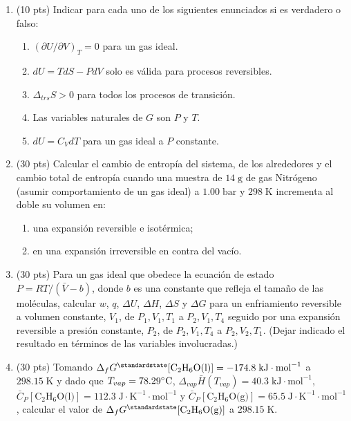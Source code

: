 \documentclass[a4paper,12pt]{article}
\begin{document}
\begin{enumerate}

 \item (10 pts) Indicar para cada uno de los siguientes enunciados si es verdadero o falso:
 \begin{enumerate}
  \item $(\partial U/\partial V)_T=0$ para un gas ideal.
  \item $dU=TdS-PdV$ solo es v\'alida para procesos reversibles. 
  \item $\Delta_{trs}S>0$ para todos los procesos de transici\'on. 
  \item Las variables naturales de $G$ son $P$ y $T$.
  \item $dU=C_VdT$ para un gas ideal a $P$ constante.
 \end{enumerate}

 \item (30 pts) Calcular el cambio de entrop\'ia del sistema, de los alrededores y el cambio total de entrop\'ia cuando una muestra de $14\;\mbox{g}$ de gas Nitr\'ogeno (asumir comportamiento de un gas ideal) a $1.00\;\mbox{bar}$ y $298\;\mbox{K}$ incrementa al doble su volumen en:
 \begin{enumerate}
  \item una expansi\'on reversible e isot\'ermica;
  \item en una expansi\'on irreversible en contra del vac\'io.
 \end{enumerate} 

 \item (30 pts) Para un gas ideal que obedece la ecuaci\'on de estado $P=RT/(\bar{V}-b)$, donde $b$ es una constante que refleja el tama\~no de las mol\'eculas, calcular $w$, $q$, $\Delta U$, $\Delta H$, $\Delta S$ y $\Delta G$ para un enfriamiento reversible a volumen constante, $V_1$, de $P_1, V_1, T_1$ a $P_2, V_1, T_4$ seguido por una expansi\'on reversible a presi\'on constante, $P_2$, de $P_2, V_1, T_4$ a $P_2, V_2, T_1$. (Dejar indicado el resultado en t\'erminos de las variables involucradas.)

 \item (30 pts) Tomando $\Delta_f G^\standardstate[\mbox{C}_2\mbox{H}_6\mbox{O(l)}]=-174.8\;\mbox{kJ}\cdot\mbox{mol}^{-1}$ a $298.15\;\mbox{K}$ y dado que $T_{vap}=78.29\celsius$, $\Delta_{vap}\bar{H}(T_{vap})=40.3\;\mbox{kJ}\cdot\mbox{mol}^{-1}$, $\bar{C}_P[\mbox{C}_2\mbox{H}_6\mbox{O(l)}]=112.3\;\mbox{J}\cdot\mbox{K}^{-1}\cdot\mbox{mol}^{-1}$ y $\bar{C}_P[\mbox{C}_2\mbox{H}_6\mbox{O(g)}]=65.5\;\mbox{J}\cdot\mbox{K}^{-1}\cdot\mbox{mol}^{-1}$, calcular el valor de $\Delta_f G^\standardstate[\mbox{C}_2\mbox{H}_6\mbox{O(g)}]$ a $298.15\;\mbox{K}$.

\end{enumerate}
\end{document}
